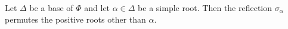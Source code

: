 Let $\Delta$ be a base of $\Phi$ and let $\alpha \in \Delta$ be a simple root. Then the reflection $\sigma_\alpha$ permutes the positive roots other than $\alpha$.